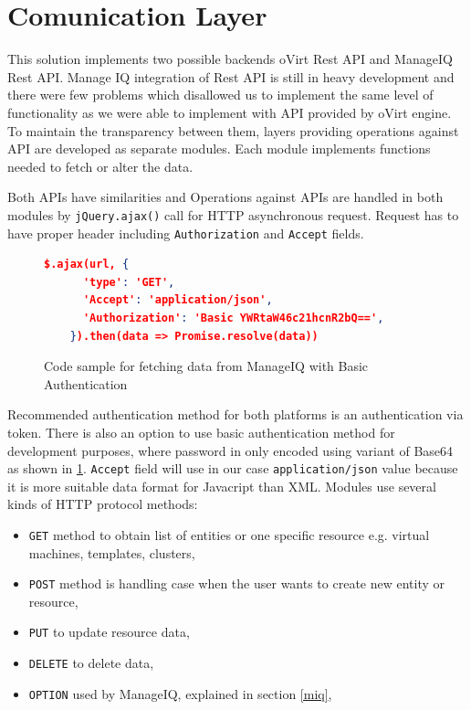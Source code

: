 \section{Comunication Layer}
This solution implements two possible backends oVirt Rest API and ManageIQ Rest API. Manage IQ integration of Rest API is still in heavy development and there were few problems which disallowed us to implement the same level of functionality as we were able to implement with API provided by oVirt engine. To maintain the transparency between them, layers providing operations against API are developed as separate modules. Each module implements functions needed to fetch or alter the data.

Both APIs have similarities and Operations against APIs are handled in both modules by \texttt{jQuery.ajax()}\cite{ajax} call for HTTP asynchronous request.
Request has to have proper header including \texttt{Authorization} and \texttt{Accept} fields. 



\begin{figure}[h]
\begin{lstlisting}[language=json]
$.ajax(url, {
      'type': 'GET',
      'Accept': 'application/json',
      'Authorization': 'Basic YWRtaW46c21hcnR2bQ==',
    }).then(data => Promise.resolve(data))
\end{lstlisting}
\caption{Code sample for fetching data from ManageIQ with Basic Authentication}
\label{base}
\end{figure}

Recommended authentication method for both platforms is an authentication via token. There is also an option to use basic authentication method for development purposes, where password in only encoded using variant of Base64 as shown in \ref{base}.
\texttt{Accept} field will use in our case \texttt{application/json} value because it is more suitable data format for Javacript than XML. Modules use several kinds of HTTP protocol methods: 
\begin{itemize}
\item \texttt{GET} method to obtain list of entities or one specific resource e.g. virtual machines, templates, clusters,
\item \texttt{POST} method is handling case when the user wants to create new entity or resource,
\item \texttt{PUT} to update resource data,
\item \texttt{DELETE} to delete data,
\item \texttt{OPTION} used by ManageIQ, explained in section \ref{miq},
\end{itemize}

